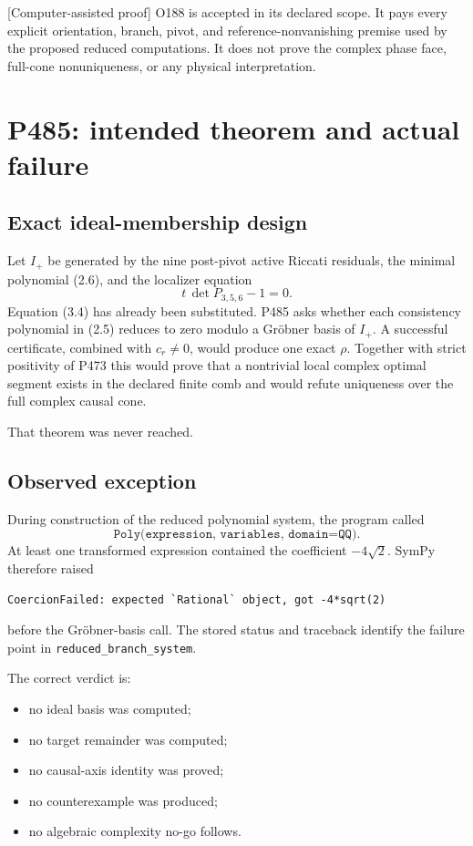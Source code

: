 \documentclass[11pt,a4paper,openany]{report}
\newcommand{\statusCAP}{\textcolor{fingreen}{[Computer-assisted proof]}}
\begin{document}
\statusCAP{} O188 is accepted in its declared scope. It pays every explicit
orientation, branch, pivot, and reference-nonvanishing premise used by the
proposed reduced computations. It does not prove the complex phase face,
full-cone nonuniqueness, or any physical interpretation.

\chapter{P485: intended theorem and actual failure}

\section{Exact ideal-membership design}

Let \(I_+\) be generated by the nine post-pivot active Riccati residuals, the
minimal polynomial (2.6), and the localizer equation
\[
 t\,\det P_{3,5,6}-1=0.                                            \tag{4.1}
\]
Equation (3.4) has already been substituted. P485 asks whether each
consistency polynomial in (2.5) reduces to zero modulo a Gröbner basis of
\(I_+\). A successful certificate, combined with \(c_r\ne0\), would produce
one exact \(\rho\). Together with strict positivity of P473 this would prove
that a nontrivial local complex optimal segment exists in the declared finite
comb and would refute uniqueness over the full complex causal cone.

That theorem was never reached.

\section{Observed exception}

During construction of the reduced polynomial system, the program called
\[
 \texttt{Poly(expression, variables, domain=QQ)}.
\]
At least one transformed expression contained the coefficient
\(-4\sqrt2\). SymPy therefore raised
\begin{Verbatim}[fontsize=\small]
CoercionFailed: expected `Rational` object, got -4*sqrt(2)
\end{Verbatim}
before the Gröbner-basis call. The stored status and traceback identify the
failure point in \texttt{reduced\_branch\_system}.

The correct verdict is:
\begin{itemize}
\item no ideal basis was computed;
\item no target remainder was computed;
\item no causal-axis identity was proved;
\item no counterexample was produced;
\item no algebraic complexity no-go follows.
\end{itemize}
\end{document}

